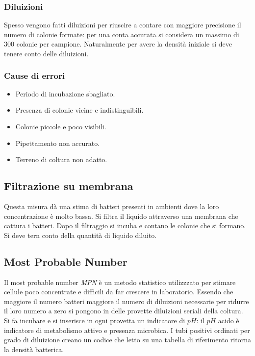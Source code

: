 		\subsubsection{Diluizioni}
		Spesso vengono fatti diluizioni per riuscire a contare con maggiore precisione il numero di colonie formate: per una conta accurata si considera un massimo di $300$ colonie per campione.
		Naturalmente per avere la densit\`a iniziale si deve tenere conto delle diluizioni.

		\subsubsection{Cause di errori}
		\begin{multicols}{2}
			\begin{itemize}
				\item Periodo di incubazione sbagliato.
				\item Presenza di colonie vicine e indistinguibili.
				\item Colonie piccole e poco visibili.
				\item Pipettamento non accurato.
				\item Terreno di coltura non adatto.
			\end{itemize}
		\end{multicols}

	\subsection{Filtrazione su membrana}
	Questa misura d\`a una stima di batteri presenti in ambienti dove la loro concentrazione \`e molto bassa.
	Si filtra il liquido attraverso una membrana che cattura i batteri.
	Dopo il filtraggio si incuba e contano le colonie che si formano.
	Si deve tern conto della quantit\`a di liquido diluito.

	\subsection{Most Probable Number}
	Il most probable number \emph{MPN} \`e un metodo statistico utilizzzato per stimare cellule poco concentrate e difficili da far crescere in laboratorio.
	Essendo che maggiore il numero batteri maggiore il numero di diluizioni necessarie per ridurre il loro numero a zero si pongono in delle provette diluizioni seriali della coltura.
	Si fa incubare e si inserisce in ogni provetta un indicatore di $pH$: il $pH$ acido \`e indicatore di metabolismo attivo e presenza microbica.
	I tubi positivi ordinati per grado di diluizione creano un codice che letto su una tabella di riferimento ritorna la densit\`a batterica.

